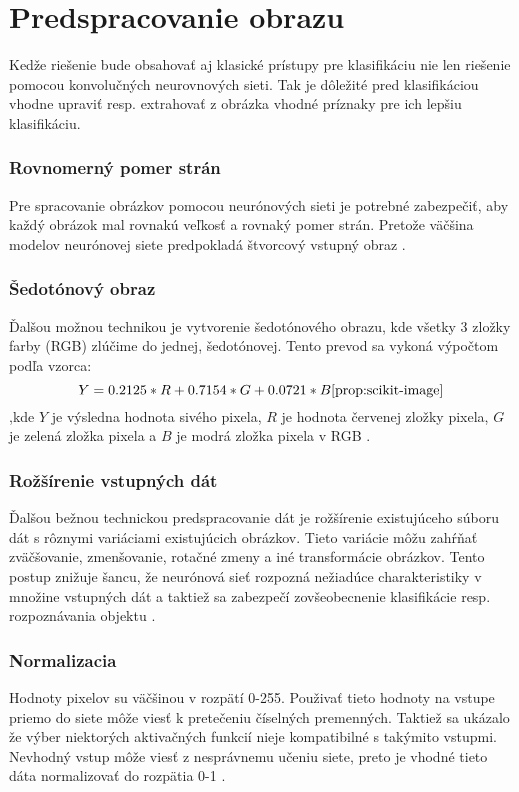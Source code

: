 
\section{Predspracovanie obrazu}
\label{sec:preprocessing}
Kedže riešenie bude obsahovať aj klasické prístupy pre klasifikáciu nie len riešenie pomocou konvolučných neurovnových sieti.
Tak je dôležité pred klasifikáciou vhodne upraviť resp. extrahovať z obrázka vhodné príznaky pre ich lepšiu klasifikáciu.

\subsubsection{Rovnomerný pomer strán}
Pre spracovanie obrázkov pomocou neurónových sieti je potrebné zabezpečiť, aby každý obrázok mal rovnakú veľkosť a rovnaký pomer strán.
Pretože väčšina modelov neurónovej siete predpokladá štvorcový vstupný obraz \cite{odkaz:NNPreprocessing}.

\subsubsection{Šedotónový obraz}
Ďalšou možnou technikou je vytvorenie šedotónového obrazu, kde všetky 3 zložky farby (RGB) zlúčime do jednej, šedotónovej.
Tento prevod sa vykoná výpočtom podľa vzorca:
\begin{equation}
    \label{eq:rgbtogray}
    Y = 0.2125*R + 0.7154*G + 0.0721*B\cite{prop:scikit-image}
\end{equation}
,kde $Y$ je výsledna hodnota sivého pixela, $R$ je hodnota červenej zložky pixela,
$G$ je zelená zložka pixela a $B$ je modrá zložka pixela v RGB \cite{odkaz:NNPreprocessing}.

\subsubsection{Rožšírenie vstupných dát}
Ďalšou bežnou technickou predspracovanie dát je rožšírenie existujúceho súboru dát s rôznymi variáciami existujúcich obrázkov.
Tieto variácie môžu zahŕňať zväčšovanie, zmenšovanie, rotačné zmeny a iné transformácie obrázkov.
Tento postup znižuje šancu, že neurónová sieť rozpozná nežiadúce charakteristiky v množine vstupných dát
	a taktiež sa zabezpečí zovšeobecnenie klasifikácie resp. rozpoznávania objektu \cite{odkaz:NNPreprocessing}.

\subsubsection{Normalizacia}
Hodnoty pixelov su väčšinou v rozpätí 0-255. Použivať tieto hodnoty na vstupe priemo do siete môže viesť k pretečeniu číselných premenných.
Taktiež sa ukázalo že výber niektorých aktivačných funkcií nieje kompatibilné s takýmito vstupmi.
Nevhodný vstup môže viesť z nesprávnemu učeniu siete, preto je vhodné tieto dáta normalizovať do rozpätia 0-1 \cite{odkaz:PreprocessingNormalization}.

